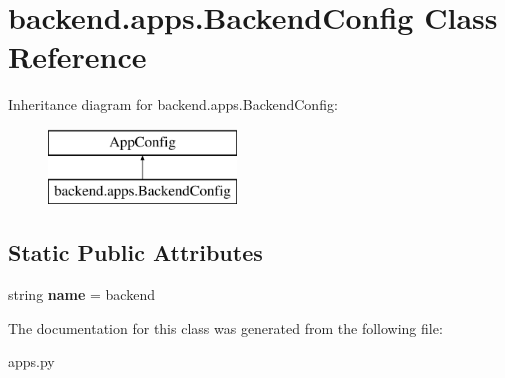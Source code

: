 \hypertarget{classbackend_1_1apps_1_1_backend_config}{}\section{backend.\+apps.\+Backend\+Config Class Reference}
\label{classbackend_1_1apps_1_1_backend_config}
Inheritance diagram for backend.\+apps.\+Backend\+Config\+:\begin{figure}[H]
\begin{center}
\leavevmode
\includegraphics[height=2.000000cm]{classbackend_1_1apps_1_1_backend_config}
\end{center}
\end{figure}
\subsection*{Static Public Attributes}
\begin{DoxyCompactItemize}
\item 
\mbox{\label{classbackend_1_1apps_1_1_backend_config_a891353e02e4b1d77f8632cf98f6f2d92}} 
string {\bfseries name} = \textquotesingle{}backend\textquotesingle{}
\end{DoxyCompactItemize}


The documentation for this class was generated from the following file\+:\begin{DoxyCompactItemize}
\item 
apps.\+py\end{DoxyCompactItemize}
